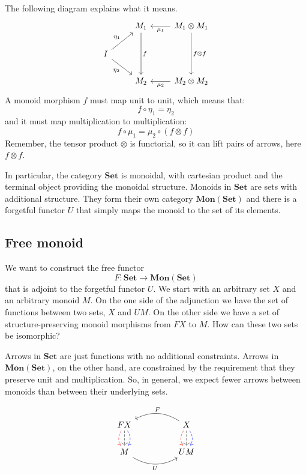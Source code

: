 \documentclass[DaoFP]{subfiles}
\begin{document}
The following diagram explains what it means.
\[
 \begin{tikzcd}
 & M_1
 \arrow[dd, "f"]
 & M_1 \otimes M_1
 \arrow[l, "\mu_1"]
 \arrow[dd, "f \otimes f"]
 \\
 I
 \arrow[ru, "\eta_1"]
 \arrow[rd, "\eta_2"']
 \\
 & M_2
 & M_2 \otimes M_2
 \arrow[l, "\mu_2"]
  \end{tikzcd}
\]
A monoid morphism $f$ must map unit to unit, which means that:
\[ f \circ \eta_1 = \eta_2 \]
and it must map multiplication to multiplication:
\[ f \circ \mu_1 = \mu_2 \circ (f \otimes f)\]
Remember, the tensor product $\otimes$ is functorial, so it can lift pairs of arrows, here $f \otimes f$.

In particular, the category $\mathbf{Set}$ is monoidal, with cartesian product and the terminal object providing the monoidal structure. Monoids in $\mathbf{Set}$ are sets with additional structure. They form their own category $\mathbf{Mon}(\mathbf{Set})$ and there is a forgetful functor $U$ that simply maps the monoid to the set of its elements.

\subsection{Free monoid}

We want to construct the free functor 
\[ F \colon \mathbf{Set} \to \mathbf{Mon}(\mathbf{Set})\]
that is adjoint to the forgetful functor $U$. We start with an arbitrary set $X$ and an arbitrary monoid $M$. On the one side of the adjunction we have the set of functions between two sets, $X$ and $U M$. On the other side we have a set of structure-preserving monoid morphisms from $F X$ to $M$. How can these two sets be isomorphic?

Arrows in $\mathbf{Set}$ are just functions with no additional constraints. Arrows in $\mathbf{Mon}(\mathbf{Set})$, on the other hand, are constrained by the requirement that they preserve unit and multiplication. So, in general, we expect fewer arrows between monoids than between their underlying sets. 

\[
 \begin{tikzcd}
F X
\arrow[d, bend right, red, dashed]
\arrow[d, dashed]
\arrow[d, bend left, blue, dashed]
  &&
  X
\arrow[d, bend right, red, dashed]
\arrow[d, dashed]
\arrow[d, bend left, blue, dashed]
 \arrow[ll, bend right, "F"']
 \\
M
   \arrow[rr, bend right, "U"']
 &&
 U M
  \end{tikzcd}
\]
\end{document}
